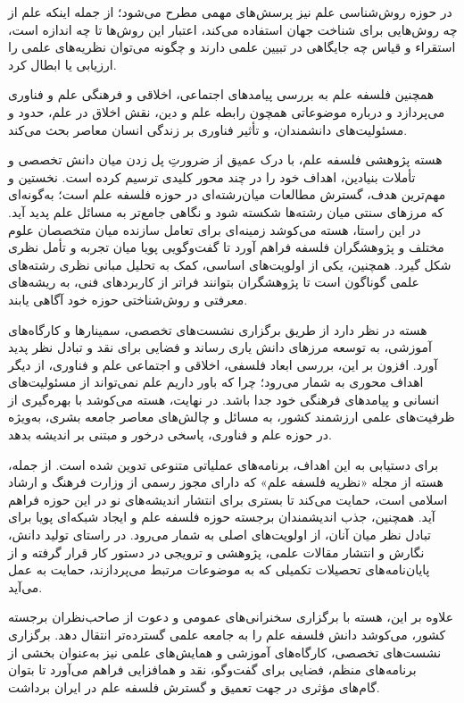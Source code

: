 \documentclass[
  letterpaper,
  DIV=11,
  numbers=noendperiod]{scrreprt}
\begin{document}
در حوزه روش‌شناسی علم نیز پرسش‌های مهمی مطرح می‌شود؛ از جمله اینکه علم از
چه روش‌هایی برای شناخت جهان استفاده می‌کند، اعتبار این روش‌ها تا چه اندازه
است، استقراء و قیاس چه جایگاهی در تبیین علمی دارند و چگونه می‌توان
نظریه‌های علمی را ارزیابی یا ابطال کرد.

همچنین فلسفه علم به بررسی پیامدهای اجتماعی، اخلاقی و فرهنگی علم و فناوری
می‌پردازد و درباره موضوعاتی همچون رابطه علم و دین، نقش اخلاق در علم، حدود
و مسئولیت‌های دانشمندان، و تأثیر فناوری بر زندگی انسان معاصر بحث می‌کند.

هسته پژوهشی فلسفه علم، با درک عمیق از ضرورتِ پل زدن میان دانش تخصصی و
تأملات بنیادین، اهداف خود را در چند محور کلیدی ترسیم کرده است. نخستین و
مهم‌ترین هدف، گسترش مطالعات میان‌رشته‌ای در حوزه فلسفه علم است؛ به‌گونه‌ای که
مرزهای سنتی میان رشته‌ها شکسته شود و نگاهی جامع‌تر به مسائل علم پدید آید.
در این راستا، هسته می‌کوشد زمینه‌ای برای تعامل سازنده میان متخصصان علوم
مختلف و پژوهشگران فلسفه فراهم آورد تا گفت‌وگویی پویا میان تجربه و تأمل
نظری شکل گیرد. همچنین، یکی از اولویت‌های اساسی، کمک به تحلیل مبانی نظری
رشته‌های علمی گوناگون است تا پژوهشگران بتوانند فراتر از کاربردهای فنی، به
ریشه‌های معرفتی و روش‌شناختی حوزه خود آگاهی یابند.

هسته در نظر دارد از طریق برگزاری نشست‌های تخصصی، سمینارها و کارگاه‌های
آموزشی، به توسعه مرزهای دانش یاری رساند و فضایی برای نقد و تبادل نظر
پدید آورد. افزون بر این، بررسی ابعاد فلسفی، اخلاقی و اجتماعی علم و
فناوری، از دیگر اهداف محوری به شمار می‌رود؛ چرا که باور داریم علم
نمی‌تواند از مسئولیت‌های انسانی و پیامدهای فرهنگی خود جدا باشد. در نهایت،
هسته می‌کوشد با بهره‌گیری از ظرفیت‌های علمی ارزشمند کشور، به مسائل و
چالش‌های معاصر جامعه بشری، به‌ویژه در حوزه علم و فناوری، پاسخی درخور و
مبتنی بر اندیشه بدهد.

برای دستیابی به این اهداف، برنامه‌های عملیاتی متنوعی تدوین شده است. از
جمله، هسته از مجله «نظریه فلسفه علم» که دارای مجوز رسمی از وزارت فرهنگ و
ارشاد اسلامی است، حمایت می‌کند تا بستری برای انتشار اندیشه‌های نو در این
حوزه فراهم آید. همچنین، جذب اندیشمندان برجسته حوزه فلسفه علم و ایجاد
شبکه‌ای پویا برای تبادل نظر میان آنان، از اولویت‌های اصلی به شمار می‌رود.
در راستای تولید دانش، نگارش و انتشار مقالات علمی، پژوهشی و ترویجی در
دستور کار قرار گرفته و از پایان‌نامه‌های تحصیلات تکمیلی که به موضوعات
مرتبط می‌پردازند، حمایت به عمل می‌آید.

علاوه بر این، هسته با برگزاری سخنرانی‌های عمومی و دعوت از صاحب‌نظران
برجسته کشور، می‌کوشد دانش فلسفه علم را به جامعه علمی گسترده‌تر انتقال دهد.
برگزاری نشست‌های تخصصی، کارگاه‌های آموزشی و همایش‌های علمی نیز به‌عنوان بخشی
از برنامه‌های منظم، فضایی برای گفت‌وگو، نقد و همافزایی فراهم می‌آورد تا
بتوان گام‌های مؤثری در جهت تعمیق و گسترش فلسفه علم در ایران برداشت.
\end{document}
